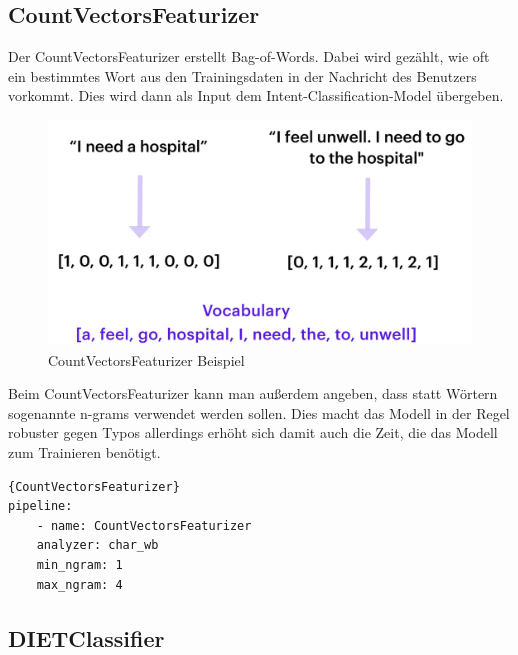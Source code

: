 \subsection{CountVectorsFeaturizer}

Der CountVectorsFeaturizer erstellt Bag-of-Words.
Dabei wird gezählt, wie oft ein bestimmtes Wort aus den Trainingsdaten in der Nachricht des Benutzers vorkommt.
Dies wird dann als Input dem Intent-Classification-Model übergeben.\cite{countVectorsFeaturizer, pipelineConfigurationVideo, pipelineComponentsYoutube, rasaMasterclassCountVectorsFeaturizer}

\begin{figure}[hbt!]
    \centering
    \includegraphics[scale=0.25]{pics/countvectorsfeaturizer}
    \caption{CountVectorsFeaturizer Beispiel~\cite{pipelineConfigurationVideo}}
    \label{fig:CountVectorsFeaturizer}
\end{figure}

Beim CountVectorsFeaturizer kann man außerdem angeben, dass statt Wörtern sogenannte n-grams verwendet werden sollen.
Dies macht das Modell in der Regel robuster gegen Typos allerdings erhöht sich damit auch die Zeit, die das Modell zum Trainieren benötigt.\cite{countVectorsFeaturizer, pipelineConfigurationVideo, pipelineComponentsYoutube, rasaMasterclassCountVectorsFeaturizer}

\begin{lstlisting}[label={lst:count-vectors-featurizer},caption={CountVectorsFeaturizer}]{CountVectorsFeaturizer}
pipeline:
    - name: CountVectorsFeaturizer
    analyzer: char_wb
    min_ngram: 1
    max_ngram: 4
\end{lstlisting}

\subsection{DIETClassifier}

